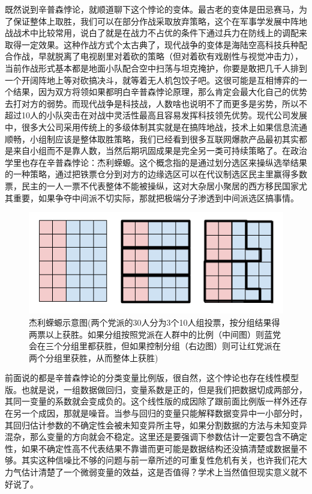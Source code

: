 \documentclass[]{tufte-book}
\begin{document}
既然说到辛普森悖论，就顺道聊下这个悖论的变体。最古老的变体是田忌赛马，为了保证整体上取胜，我们可以在部分作战采取放弃策略，这个在军事学发展中阵地战战术中比较常用，说白了就是在战力不占优的条件下通过兵力在防线上的调配来取得一定效果。这种作战方式个太古典了，现代战争的变体是海陆空高科技兵种配合作战，早就脱离了电视剧里对着砍的策略（但对着砍有戏剧性与视觉冲击力），当前作战形式基本都是地面小队配合空中扫荡与坦克掩护，你要是敢把几千人排到一个开阔阵地上等对砍搞决斗，就等着无人机包饺子吧。这很可能是互相博弈的一个结果，因为双方将领如果都明白辛普森悖论原理，那么肯定会最大化自己的优势去打对方的弱势。而现代战争是科技战，人数啥也说明不了而更多是劣势，所以不超过10人的小队突击在对战中灵活性最高且容易发挥科技领先优势。现代公司发展中，很多大公司采用传统上的多级体制其实就是在搞阵地战，技术上如果信息流通顺畅，小组制应该是整体取胜策略，我们已经看到很多互联网爆款产品最初其实都是来自小组而不是靠人数，当然后期巩固成果是完全另一类可持续策略了。在政治学里也存在辛普森悖论：杰利蝾螈。这个概念指的是通过划分选区来操纵选举结果的一种策略，通过把铁票仓分到对方的边缘选区可以在代议制选区民主里赢得多数票，民主的一人一票不代表整体不能被操纵，这对大杂居小聚居的西方移民国家尤其重要，如果争夺中间派不切实际，那就把极端分子渗透到中间派选区搞事情。

\begin{figure}
\includegraphics{data/gerrymandering} \caption[杰利蝾螈示意图(两个党派的30人分为3个10人组投票，按分组结果得两票以上获胜。如果分组按照党派在人群中的比例（中间图）则蓝党会在三个分组里都获胜，但如果控制分组（右边图）则可让红党派在两个分组里获胜，从而整体上获胜)]{杰利蝾螈示意图(两个党派的30人分为3个10人组投票，按分组结果得两票以上获胜。如果分组按照党派在人群中的比例（中间图）则蓝党会在三个分组里都获胜，但如果控制分组（右边图）则可让红党派在两个分组里获胜，从而整体上获胜)}\label{fig:unnamed-chunk-16}
\end{figure}

前面说的都是辛普森悖论的分类变量比例版，很自然，这个悖论也存在线性模型版。也就是说，一组数据做回归，变量系数是正的，但是我们把数据切成两部分，其同一变量的系数就会变成负的。这个线性版的成因除了跟前面比例版一样外还存在另一个成因，那就是噪音。当参与回归的变量只能解释数据变异中一小部分时，其回归估计参数的不确定性会被未知变异所主导，如果分割数据的方法与未知变异混杂，那么变量的方向就会不稳定。这里还是要强调下参数估计一定要包含不确定性，如果不确定性高不代表结果不靠谱而更可能是数据结构还没搞清楚或数据量不够。其实这种信噪比不够的问题与前一章所述的可重复性危机有关，也许我们花大力气估计清楚了一个微弱变量的效益，这是否值得？学术上当然值但现实意义就不好说了。
\end{document}
